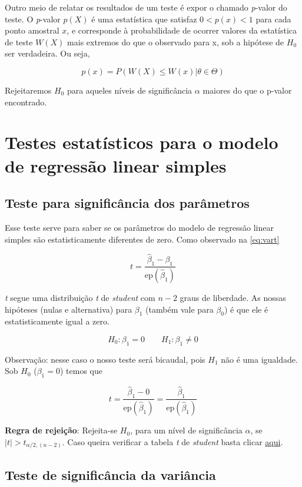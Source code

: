 Outro meio de relatar os resultados de um teste é expor o chamado \textit{p}-valor do teste. O \textit{p}-valor $p(X)$ é uma estatística que satisfaz $0 < p(x) < 1$ para cada ponto amostral $x$, e corresponde à probabilidade de ocorrer valores da estatística de teste $W(X)$ mais extremos do que o observado para x, sob a hipótese de $H_0$ ser verdadeira. Ou seja,

$$ p(x) = P(W(X) \leq W(x)| \theta \in \Theta)  $$

\noindent Rejeitaremos $H_0$ para aqueles níveis de significância $\alpha$ maiores do que o p-valor
encontrado.

\section{Testes estatísticos para o modelo de regressão linear simples}

\subsection{Teste para significância dos parâmetros}
\label{ch:teste1}
\noindent Esse teste serve para saber se os parâmetros do modelo de regressão linear simples são estatisticamente diferentes de zero. Como observado na \autoref{eq:vart} 

$$t = \dfrac{\hat{\beta}_1 - \beta_1}{\text{ep}(\hat{\beta}_1)}$$

\noindent \textit{t} segue uma distribuição \textit{t} de \textit{student} com $n-2$ graus de liberdade. As nossas hipóteses (nulas e alternativa) para $\beta_1$ (também vale para $\beta_0$) é que ele é estatisticamente igual a zero.

$$H_0: \beta_1 = 0 \qquad H_1: \beta_1 \neq 0$$

\noindent Observação: nesse caso o nosso teste será bicaudal, pois $H_1$ não é uma igualdade.\\

\noindent Sob $H_0$ ($\beta_1 = 0$) temos que

$$t = \dfrac{\hat{\beta}_1 - 0}{\text{ep}(\hat{\beta}_1)} =  \dfrac{\hat{\beta}_1 }{\text{ep}(\hat{\beta}_1)}$$

\noindent \textbf{Regra de rejeição}: Rejeita-se $H_0$, para um nível de significância $\alpha$, se $|t| > t_{\alpha/2, (n-2)}$. Caso queira verificar a tabela \textit{t} de \textit{student} basta clicar \href{https://sites.icmc.usp.br/francisco/SME0123/listas/Tabela_Dist_t.pdf}{aqui}.

\subsection{Teste de significância da variância}

